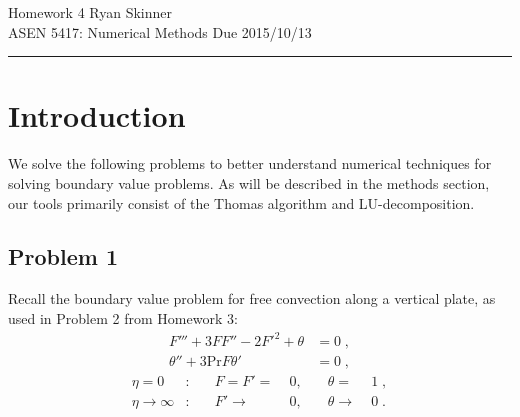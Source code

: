 \documentclass[11pt]{article}
\begin{document}
\pagestyle{fancyplain}
\lhead{}
\chead{}
\rhead{}
\cfoot{\hrule \thepage}

\noindent
{\Large Homework 4}
\hfill
{\large Ryan Skinner}
\\[0.5ex]
{\large ASEN 5417: Numerical Methods}
\hfill
{\large Due 2015/10/13}\\
\hrule
\vspace{6pt}

\section{Introduction} %

We solve the following problems to better understand numerical techniques for solving boundary value problems. As will be described in the methods section, our tools primarily consist of the Thomas algorithm and LU-decomposition.

\subsection{Problem 1}

Recall the boundary value problem for free convection along a vertical plate, as used in Problem 2 from Homework 3:
\begin{equation}
\begin{aligned}
F''' + 3 F F'' - 2F'^2 + \theta &= 0 \;, \\
\theta'' + 3 \text{Pr} F \theta' &= 0 \;,
\end{aligned}
\label{eq:prob1_original}
\end{equation}
\begin{equation}
\begin{aligned}
\eta = 0 &: &\quad F = F' =\; &0, &\quad \theta =\; &1 \;, \\
\eta \rightarrow \infty &: &\quad F' \rightarrow\; &0, &\quad \theta \rightarrow\; &0
\;.
\end{aligned}
\label{eq:prob1_original_bcs}
\end{equation}
\end{document}
